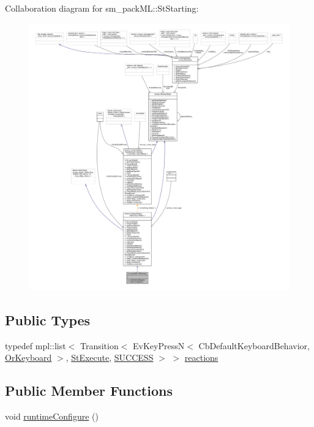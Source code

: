Collaboration diagram for sm\+\_\+pack\+ML\+:\+:St\+Starting\+:
\nopagebreak
\begin{figure}[H]
\begin{center}
\leavevmode
\includegraphics[width=350pt]{structsm__packML_1_1StStarting__coll__graph}
\end{center}
\end{figure}
\subsection*{Public Types}
\begin{DoxyCompactItemize}
\item 
typedef mpl\+::list$<$ Transition$<$ Ev\+Key\+PressN$<$ Cb\+Default\+Keyboard\+Behavior, \hyperlink{classsm__packML_1_1OrKeyboard}{Or\+Keyboard} $>$, \hyperlink{structsm__packML_1_1StExecute}{St\+Execute}, \hyperlink{classSUCCESS}{S\+U\+C\+C\+E\+SS} $>$ $>$ \hyperlink{structsm__packML_1_1StStarting_a904cf3eb697547a33964bcdabea0ae2e}{reactions}
\end{DoxyCompactItemize}
\subsection*{Public Member Functions}
\begin{DoxyCompactItemize}
\item 
void \hyperlink{structsm__packML_1_1StStarting_a5fa3513fd8240842dbad5d1c0c101949}{runtime\+Configure} ()
\end{DoxyCompactItemize}
